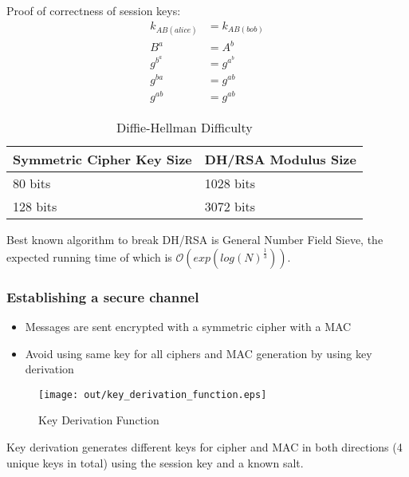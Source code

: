 \documentclass[a4paper]{article}
\begin{document}

Proof of correctness of session keys:
\begin{align*}
  k_{AB(alice)} &= k_{AB(bob)} \\
  B^{a} &= A^{b} \\
  g^{b^{a}} &= g^{a^{b}} \\
  g^{ba} &= g^{ab} \\
  g^{ab} &= g^{ab}
\end{align*}


\begin{table}[h]
  \centering
  \begin{tabular}{@{}ll@{}}
    \toprule
    Symmetric Cipher Key Size & DH/RSA Modulus Size \\
    \midrule
    80 bits                   & 1028 bits           \\
    128 bits                  & 3072 bits           \\
    \bottomrule
  \end{tabular}
  \caption{Diffie-Hellman Difficulty}
  \label{tab:diffie_hellman_difficulty}
\end{table}
\FloatBarrier

Best known algorithm to break DH/RSA is General Number Field Sieve, the expected
running time of which is $\mathcal{O}(exp(log(N)^{\frac{1}{3}}))$.

\subsubsection{Establishing a secure channel}

\begin{itemize}
  \item Messages are sent encrypted with a symmetric cipher with a MAC
  \item Avoid using same key for all ciphers and MAC generation by using key
        derivation
\end{itemize}

\begin{figure}[h!]
  \centering
  \texttt{[image: out/key\_derivation\_function.eps]}
  \caption{Key Derivation Function}
  \label{fig:key_derivation_function}
\end{figure}
\FloatBarrier

Key derivation generates different keys for cipher and MAC in both directions (4
unique keys in total) using the session key and a known salt.
\end{document}
